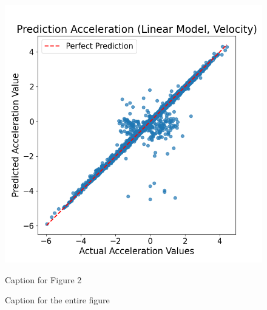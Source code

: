 \begin{figure}[t]
\begin{minipage}[b]{0.45\columnwidth}
        \includegraphics[width=\columnwidth]{images/figures/Prediction Acceleration (Linear Model, Velocity).png}
        \caption{Caption for Figure 2}
        \label{fig:minipage4}
    \end{minipage}
    \caption{Caption for the entire figure}
    \label{fig:combined_figure_2}
\end{figure}


